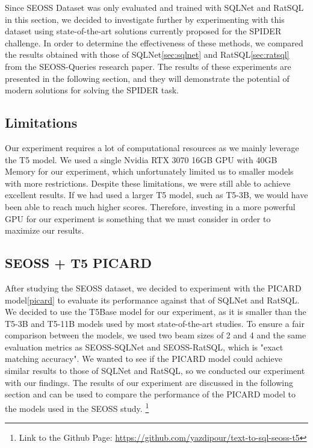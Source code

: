 Since SEOSS Dataset\cite{RATH2019104005} was only evaluated and trained with SQLNet and RatSQL in this section, we decided to investigate further by experimenting with this dataset using state-of-the-art solutions currently proposed for the SPIDER challenge. In order to determine the effectiveness of these methods, we compared the results obtained with those of SQLNet\ref{sec:sqlnet} and RatSQL\ref{sec:ratsql} from the SEOSS-Queries research paper\cite{TOMOVA2022108211}. The results of these experiments are presented in the following section, and they will demonstrate the potential of modern solutions for solving the SPIDER task.

\subsection{Limitations}

Our experiment requires a lot of computational resources as we mainly leverage the T5 model. We used a single Nvidia RTX 3070 16GB GPU with 40GB Memory for our experiment, which unfortunately limited us to smaller models with more restrictions. Despite these limitations, we were still able to achieve excellent results. If we had used a larger T5 model, such as T5-3B, we would have been able to reach much higher scores. Therefore, investing in a more powerful GPU for our experiment is something that we must consider in order to maximize our results.

\subsection{SEOSS + T5 PICARD}
After studying the SEOSS dataset, we decided to experiment with the PICARD model\ref{picard} to evaluate its performance against that of SQLNet and RatSQL. We decided to use the T5Base model for our experiment, as it is smaller than the T5-3B and T5-11B models used by most state-of-the-art studies. To ensure a fair comparison between the models, we used two beam sizes of 2 and 4 and the same evaluation metrics as SEOSS-SQLNet and SEOSS-RatSQL, which is "exact matching accuracy". We wanted to see if the PICARD model could achieve similar results to those of SQLNet and RatSQL, so we conducted our experiment with our findings. The results of our experiment are discussed in the following section and can be used to compare the performance of the PICARD model to the models used in the SEOSS study.
\footnote[1]{Link to the Github Page: \url{https://github.com/yazdipour/text-to-sql-seoss-t5}}

